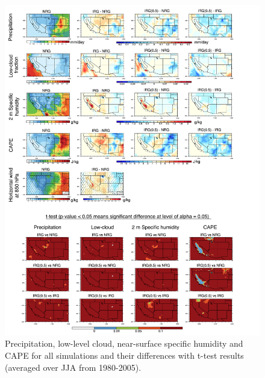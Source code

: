 \begin{figure}
\begin{center}
\includegraphics[width=6in]{supplement/irrig_discussion_vs_Lo2013.pdf}
\caption{Precipitation, low-level cloud, near-surface specific humidity and CAPE for all simulations and their differences with t-test results (averaged over JJA from 1980-2005).}
\end{center}
\end{figure}



















